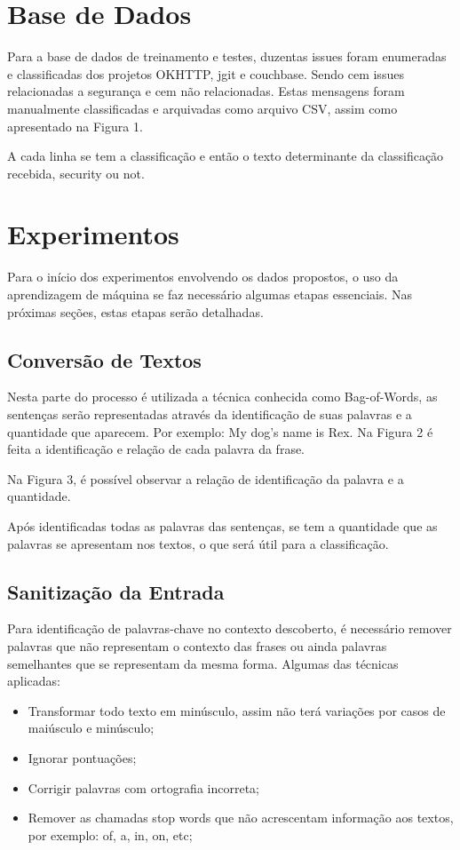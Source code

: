 \documentclass[conference]{IEEEtran}
\begin{document}
\section{Base de Dados}

Para a base de dados de treinamento e testes, duzentas issues foram enumeradas e classificadas dos projetos OKHTTP, jgit e couchbase. Sendo cem issues relacionadas a segurança e cem não relacionadas. Estas mensagens foram manualmente classificadas e arquivadas como arquivo CSV, assim como apresentado na Figura 1.

A cada linha se tem a classificação e então o texto determinante da classificação recebida, security ou not.

\section{Experimentos}

Para o início dos experimentos envolvendo os dados propostos, o uso da aprendizagem de máquina se faz necessário algumas etapas essenciais. Nas próximas seções, estas etapas serão detalhadas.

\subsection{Conversão de Textos}

Nesta parte do processo é utilizada a técnica conhecida como Bag-of-Words, as sentenças serão representadas através da identificação de suas palavras e a quantidade que aparecem.
Por exemplo: My dog’s name is Rex.
Na Figura 2 é feita a identificação e relação de cada palavra da frase.

Na Figura 3, é possível observar a relação de identificação da palavra e a quantidade.

Após identificadas todas as palavras das sentenças, se tem a quantidade que as palavras se apresentam nos textos, o que será útil para a classificação.

\subsection{Sanitização da Entrada}

Para identificação de palavras-chave no contexto descoberto, é necessário remover palavras que não representam o contexto das frases ou ainda palavras semelhantes que se representam da mesma forma. Algumas das técnicas aplicadas:

\begin{itemize}
    \item Transformar todo texto em minúsculo, assim não terá variações por casos de maiúsculo e minúsculo;
    \item Ignorar pontuações;
    \item Corrigir palavras com ortografia incorreta;
    \item Remover as chamadas stop words que não acrescentam informação aos textos, por exemplo:  of, a, in, on, etc;
\end{itemize}
\end{document}
